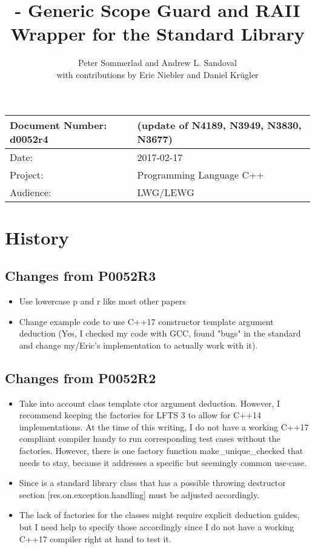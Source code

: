 \documentclass[ebook,11pt,article]{memoir}
\title{\papernumber{} - Generic Scope Guard and RAII Wrapper for the Standard Library}
\author{Peter Sommerlad and Andrew L. Sandoval\\with contributions by Eric Niebler and Daniel Kr\"ugler}
\date{\paperdate}                        %
\newcommand{\papernumber}{d0052r4}
\newcommand{\paperdate}{2017-02-17}
\begin{document}
\maketitle
\begin{tabular}[t]{|l|l|}\hline 
Document Number: \papernumber &   (update of N4189, N3949, N3830, N3677)\\\hline
Date: & \paperdate \\\hline
Project: & Programming Language C++\\\hline 
Audience: & LWG/LEWG\\\hline
\end{tabular}

\chapter{History}
\section{Changes from P0052R3}
\begin{itemize}
\item Use lowercase p and r like most other papers
\item Change example code to use C++17 constructor template argument deduction (Yes, I checked my code with GCC, found "bugs" in the standard and change my/Eric's implementation to actually work with it).
\end{itemize}

\section{Changes from P0052R2}
\begin{itemize}
\item Take into account class template ctor argument deduction. However, I recommend keeping the factories for LFTS 3 to allow for C++14 implementations. At the time of this writing, I do not have a working C++17 compliant compiler handy to run corresponding test cases without the factories. However, there is one factory function make_unique_checked that needs to stay, because it addresses a specific but seemingly common use-case.
\item Since  is a standard library class that has a possible throwing destructor section [res.on.exception.handling] must be adjusted accordingly.
\item The lack of factories for the classes might require explicit deduction guides, but I need help to specify those accordingly since I do not have a working C++17 compiler right at hand to test it.
\end{itemize}
\end{document}
